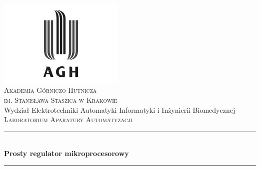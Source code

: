 \begin{titlepage}

\newcommand{\HRule}{\rule{\linewidth}{0.5mm}}

\center
 

\includegraphics[width=6cm]{../res/img/logo.png}\\[1cm]
 
 

\textsc{\LARGE Akademia Górniczo-Hutnicza \\[0.2cm]
im. Stanisława Staszica w Krakowie}\\[1.5cm]

\textrm{\Large Wydział Elektrotechniki Automatyki Informatyki i Inżynierii
Biomedycznej}\\[1cm]

\textsc{\Large Laboratorium Aparatury Automatyzacji}\\[0.5cm]


\HRule \\[0.4cm]
{ \huge \bfseries Prosty regulator mikroprocesorowy 
}\\%
\HRule \\[1.5cm]


\end{titlepage}
